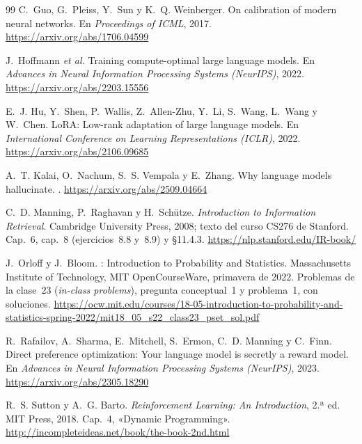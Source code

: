 \begin{thebibliography}{99}
C.~Guo, G.~Pleiss, Y.~Sun y K.~Q. Weinberger.
\newblock On calibration of modern neural networks.
\newblock En \emph{Proceedings of ICML}, 2017.
\newblock \url{https://arxiv.org/abs/1706.04599}

J.~Hoffmann \emph{et al.}
\newblock Training compute-optimal large language models.
\newblock En \emph{Advances in Neural Information Processing Systems (NeurIPS)}, 2022.
\newblock \url{https://arxiv.org/abs/2203.15556}

E.~J. Hu, Y.~Shen, P.~Wallis, Z.~Allen-Zhu, Y.~Li, S.~Wang, L.~Wang y W.~Chen.
\newblock LoRA: Low-rank adaptation of large language models.
\newblock En \emph{International Conference on Learning Representations (ICLR)}, 2022.
\newblock \url{https://arxiv.org/abs/2106.09685}

A.~T. Kalai, O.~Nachum, S.~S. Vempala y E.~Zhang.
\newblock Why language models hallucinate.
.
\newblock \url{https://arxiv.org/abs/2509.04664}

C.~D. Manning, P.~Raghavan y H.~Schütze.
\newblock \emph{Introduction to Information Retrieval}.
\newblock Cambridge University Press, 2008; texto del curso CS276 de Stanford. Cap.~6, cap.~8 (ejercicios~8.8 y~8.9) y §11.4.3.
\newblock \url{https://nlp.stanford.edu/IR-book/}

J.~Orloff y J.~Bloom.
: Introduction to Probability and Statistics.
\newblock Massachusetts Institute of Technology, MIT OpenCourseWare, primavera de 2022. Problemas de la clase~23 (\emph{in-class problems}), pregunta conceptual~1 y problema~1, con soluciones.
\newblock \url{https://ocw.mit.edu/courses/18-05-introduction-to-probability-and-statistics-spring-2022/mit18_05_s22_class23_pset_sol.pdf}

R.~Rafailov, A.~Sharma, E.~Mitchell, S.~Ermon, C.~D. Manning y C.~Finn.
\newblock Direct preference optimization: Your language model is secretly a reward model.
\newblock En \emph{Advances in Neural Information Processing Systems (NeurIPS)}, 2023.
\newblock \url{https://arxiv.org/abs/2305.18290}

R.~S. Sutton y A.~G. Barto.
\newblock \emph{Reinforcement Learning: An Introduction}, 2.ª ed.
\newblock MIT Press, 2018. Cap.~4, «Dynamic Programming».
\newblock \url{http://incompleteideas.net/book/the-book-2nd.html}

\end{thebibliography}
